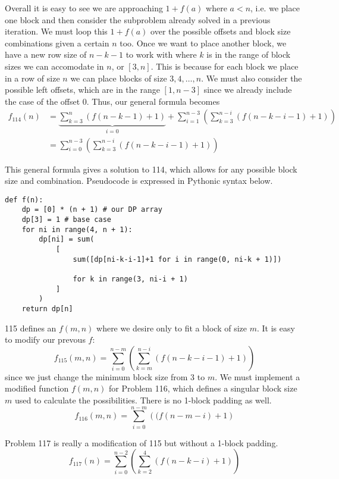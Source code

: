 \documentclass{article}
\begin{document}
Overall it is easy to see we are approaching $1 + f(a)$ where $a<n$, i.e. we place one block and then consider the subproblem
already solved in a previous iteration. We must loop this $1+f(a)$ over the possible offsets and block size combinations given a certain $n$ too.
Once we want to place another block, we have a new row size of $n-k-1$ to work with
where $k$ is in the range of block sizes we can accomodate in $n$, or $[3,n]$. This is because for each block we place
in a row of size $n$ we can place blocks of size $3,4,\ldots,n$. We must also consider the possible left offsets,
which are in the range $[1, n-3]$ since we already include the case of the offset 0.
Thus, our general formula becomes
\begin{align*}
	f_{114}(n)&=\underbrace{\sum_{k=3}^n (f(n-k-1)+1)}_{i=0} + \sum_{i=1}^{n-3}\left(\sum_{k=3}^{n-i} (f(n-k-i-1) + 1)\right)\\
	&=\sum_{i=0}^{n-3}\left(\sum_{k=3}^{n-i} \left(f(n-k-i-1) + 1\right)\right)
\end{align*}

This general formula gives a solution to 114, which allows for any possible block size and combination. Pseudocode is expressed in Pythonic syntax below.
\begin{lstlisting}
def f(n):
	dp = [0] * (n + 1) # our DP array
	dp[3] = 1 # base case
	for ni in range(4, n + 1):
		dp[ni] = sum(
			[ 
				sum([dp[ni-k-i-1]+1 for i in range(0, ni-k + 1)])

				for k in range(3, ni-i + 1) 
			]
		)
	return dp[n]
\end{lstlisting}
115 defines an $f(m,n)$ where we desire only to fit a block of size $m$. It is easy to modify our prevous $f$:
\begin{equation*}
	f_{115}(m,n)=\sum_{i=0}^{n-m}\left(\sum_{k=m}^{n-i} \left(f(n-k-i-1) + 1\right)\right)
\end{equation*}
since we just change the minimum block size from 3 to $m$.
We must implement a modified function $f(m,n)$ for Problem 116, which defines a singular
block size $m$ used to calculate the possibilities. There is no 1-block padding as well.
\begin{equation*}
	f_{116}(m,n)=\sum_{i=0}^{n-m}\left((f(n-m-i) + 1\right)
\end{equation*}

Problem 117 is really a modification of 115 but without a 1-block padding.
\begin{equation*}
	f_{117}(n) = \sum_{i=0}^{n-2}\left(\sum_{k=2}^{4} \left(f(n-k-i) + 1\right)\right)
\end{equation*}
\end{document}

